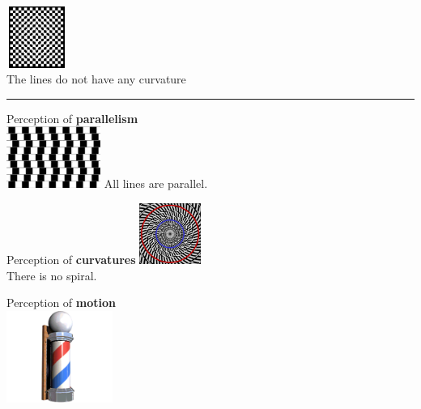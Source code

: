 \documentclass[a4paper, fontsize=8pt, landscape, DIV=1]{scrartcl}
\begin{document}
\begin{multicols*}{4}
\begin{minipage}[t]{0.49\columnwidth}
\begin{flushright}
{				\includegraphics[width=2cm, height=2cm]{images/Introduction/perc_straight.png}\\}
				The lines do not have any curvature
			\end{flushright}
		\end{minipage}	
		\hrule
		\begin{minipage}[t]{0.49\columnwidth}
			\begin{flushleft}
				{\centering Perception of \textbf{parallelism}\\}
				\includegraphics[width=\columnwidth, height=2cm]{images/Introduction/perc_parallel.png} 
				All lines are parallel.
			\end{flushleft}
		\end{minipage}
		\begin{minipage}[t]{0.49\columnwidth}
			\begin{flushright}
				{\centering Perception of \textbf{curvatures}
				\includegraphics[width=2cm, height=2cm]{images/Introduction/perc_curvature.png}\\}
				There is no spiral.
			\end{flushright}
		\end{minipage}
		\begin{minipage}[t]{0.49\columnwidth}
			\begin{flushleft}
				{\centering Perception of \textbf{motion}\\}
				\includegraphics[width=\columnwidth, height=3cm]{images/Introduction/perc_motion.png} 

\end{flushleft}
\end{minipage}
\end{multicols*}
\end{document}
